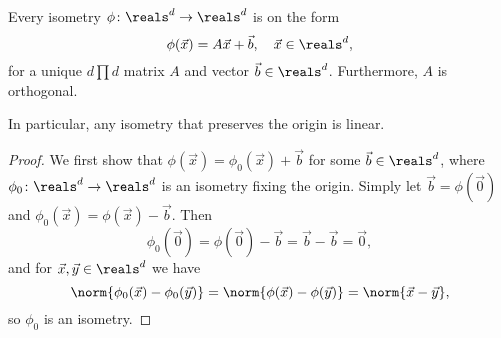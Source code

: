 \documentclass[article, a4paper, 11pt, oneside]{memoir}
\numberwithin{equation}{chapter}
\begin{document}
\begin{proposition}
    \label{prop:isometry-characterisation-Euclidean-space}
    Every isometry $\phi \colon \reals^d \to \reals^d$ is on the form
    \begin{equation*}
        \phi(\vec{x})
            = A \vec{x} + \vec{b}, \quad \vec{x} \in \reals^d,
    \end{equation*}
    for a unique $d \prod d$ matrix $A$ and vector $\vec{b} \in \reals^d$. Furthermore, $A$ is orthogonal.
\end{proposition}
%
In particular, any isometry that preserves the origin is linear.

\begin{proof}
    We first show that $\phi(\vec{x}) = \phi_0(\vec{x}) + \vec{b}$ for some $\vec{b} \in \reals^d$, where $\phi_0 \colon \reals^d \to \reals^d$ is an isometry fixing the origin. Simply let $\vec{b} = \phi(\vec{0})$ and $\phi_0(\vec{x}) = \phi(\vec{x}) - \vec{b}$. Then
    \begin{equation*}
        \phi_0(\vec{0})
            = \phi(\vec{0}) - \vec{b}
            = \vec{b} - \vec{b}
            = \vec{0},
    \end{equation*}
    and for $\vec{x}, \vec{y} \in \reals^d$ we have
    \begin{equation*}
        \norm{ \phi_0(\vec{x}) - \phi_0(\vec{y}) }
            = \norm{ \phi(\vec{x}) - \phi(\vec{y}) }
            = \norm{\vec{x} - \vec{y}},
    \end{equation*}
    so $\phi_0$ is an isometry.


\end{proof}
\end{document}
